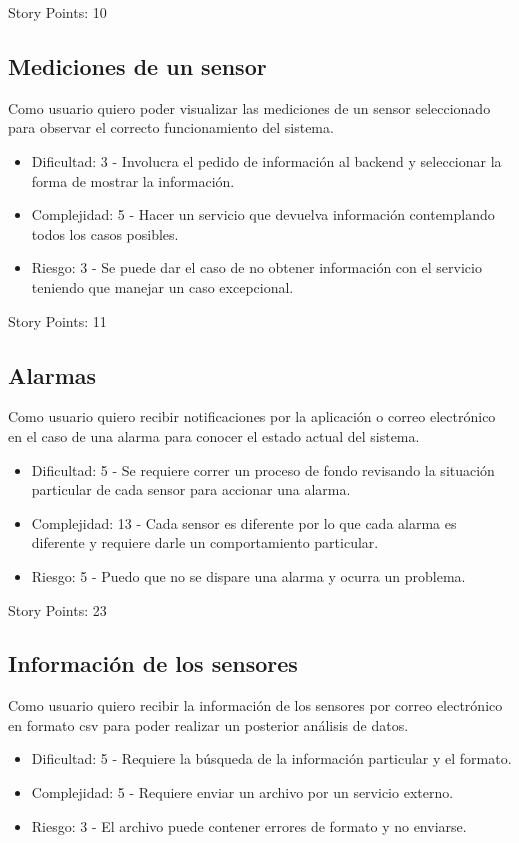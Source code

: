 \documentclass[
11pt, %
]{charter}
\begin{document}
Story Points: 10
\subsection{Mediciones de un sensor}
Como usuario quiero poder visualizar las mediciones de un sensor seleccionado para observar el correcto funcionamiento del sistema.
\begin{itemize}
	\item Dificultad: 3 - Involucra el pedido de información al backend y seleccionar la forma de mostrar la información.
	\item Complejidad: 5 - Hacer un servicio que devuelva información contemplando todos los casos posibles.
	\item Riesgo: 3 - Se puede dar el caso de no obtener información con el servicio teniendo que manejar un caso excepcional.
\end{itemize}

Story Points: 11
\subsection{Alarmas}
Como usuario quiero recibir notificaciones por la aplicación o correo electrónico en el caso de una alarma para conocer el estado actual del sistema.
\begin{itemize}
	\item Dificultad: 5 - Se requiere correr un proceso de fondo revisando la situación particular de cada sensor para accionar una alarma.
	\item Complejidad: 13 - Cada sensor es diferente por lo que cada alarma es diferente y requiere darle un comportamiento particular.
	\item Riesgo: 5 - Puedo que no se dispare una alarma y ocurra un problema.
\end{itemize}

Story Points: 23
\subsection{Información de los sensores}
Como usuario quiero recibir la información de los sensores por correo electrónico en formato csv para poder realizar un posterior análisis de datos.
\begin{itemize}
	\item Dificultad: 5 - Requiere la búsqueda de la información particular y el formato.
	\item Complejidad: 5 - Requiere enviar un archivo por un servicio externo.
	\item Riesgo: 3 - El archivo puede contener errores de formato y no enviarse.
\end{itemize}
\end{document}
